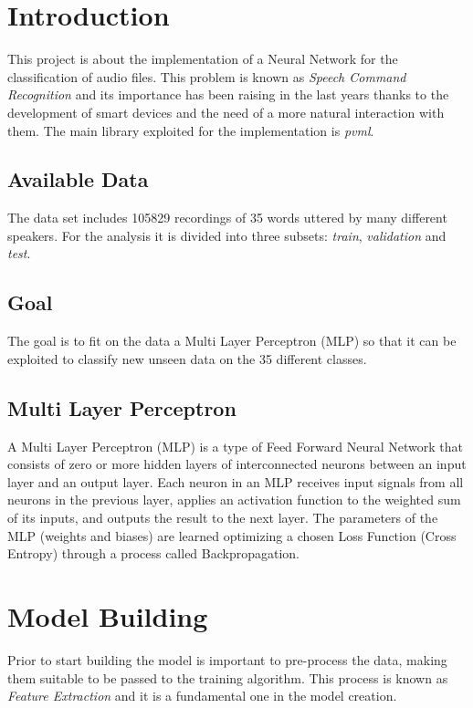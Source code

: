 \documentclass{article}
\begin{document}
\begin{multicols}{2}
    
\section{Introduction}
This project is about the implementation of a Neural Network for the classification of audio files. This problem is known as \textit{Speech Command Recognition} and its importance has been raising 
in the last years thanks to the development of smart devices and the need of a more natural interaction with them. The main library exploited for the implementation is \textit{pvml}.

\subsection{Available Data}
The data set includes 105829 recordings of 35 words uttered by many different speakers. For the analysis it is divided into three subsets: \textit{train}, \textit{validation} and \textit{test}.

\subsection{Goal}
The goal is to fit on the data a Multi Layer Perceptron (MLP) so that it can be exploited to classify new unseen data on the 35 different classes.

\subsection{Multi Layer Perceptron}
A Multi Layer Perceptron (MLP) is a type of Feed Forward Neural Network that consists of zero or more hidden layers of interconnected neurons between an input layer and an output layer. 
Each neuron in an MLP receives input signals from all neurons in the previous layer, applies an activation function to the weighted sum of its inputs, and outputs the result to the next layer. 
The parameters of the MLP (weights and biases) are learned optimizing a chosen Loss Function (Cross Entropy) through a process called Backpropagation. 



\section{Model Building}
Prior to start building the model is important to pre-process the data, making them suitable to be passed to the training algorithm. This process is known as \textit{Feature Extraction} and it is
a fundamental one in the model creation.


\end{multicols}
\end{document}
